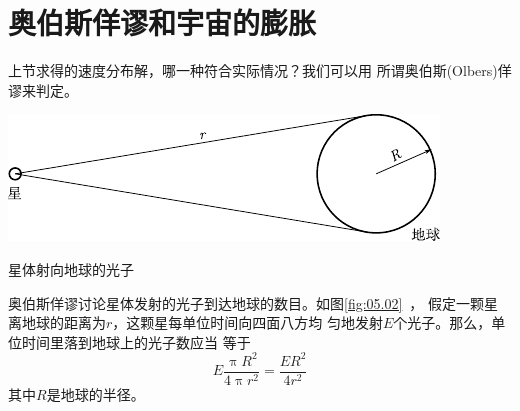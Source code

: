 \section{奥伯斯佯谬和宇宙的膨胀}\label{sec:05.04}

上节求得的速度分布解，哪一种符合实际情况？我们可以用
所谓奥伯斯(Olbers)佯谬来判定。
\begin{figurex}
    \centering
    \includegraphics{figure/fig05.02}
    \caption{星体射向地球的光子}
    \label{fig:05.02}
\end{figurex}

奥伯斯佯谬讨论星体发射的光子到达地球的数目。如图\ref{fig:05.02}~，
假定一颗星离地球的距离为$ r $，这颗星每单位时间向四面八方均
匀地发射$ E $个光子。那么，单位时间里落到地球上的光子数应当
等于
\begin{equation}\label{eqn:05.04.01}
    E \frac { \uppi R ^ { 2 } } { 4 \uppi r ^ { 2 } } = \frac { E R ^ { 2 } } { 4 r ^ { 2 } }
\end{equation}
其中$ R $是地球的半径。

